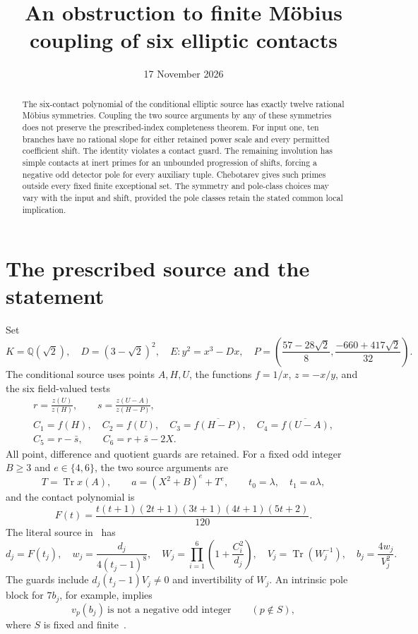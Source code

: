 \documentclass[11pt,a4paper]{article}
\title{An obstruction to finite M\"obius coupling of six elliptic contacts}
\author{}\date{17 November 2026}
\newcommand{\Q}{\mathbb Q}\newcommand{\Z}{\mathbb Z}
\DeclareMathOperator{\Tr}{Tr}\DeclareMathOperator{\Gal}{Gal}
\begin{document}
\maketitle
\begin{abstract}
The six-contact polynomial of the conditional elliptic source has
exactly twelve rational M\"obius symmetries. Coupling the two source
arguments by any of these symmetries does not preserve the prescribed-index
completeness theorem. For input one, ten branches have no rational slope
for either retained power scale and every permitted coefficient shift.
The identity violates a contact guard. The remaining involution has
simple contacts at inert primes for an unbounded progression of shifts,
forcing a negative odd detector pole for every auxiliary tuple.
Chebotarev gives such primes outside every fixed finite exceptional set.
The symmetry and pole-class choices may vary with the input and shift,
provided the pole classes retain the stated common local implication.
\end{abstract}

\section{The prescribed source and the statement}

Set
\[
 K=\Q(\sqrt2),\quad D=(3-\sqrt2)^2,\quad E:y^2=x^3-Dx,
 \quad P=\left(\frac{57-28\sqrt2}{8},
                    \frac{-660+417\sqrt2}{32}\right).
\]
The conditional source uses points $A,H,U$, the functions
$f=1/x$, $z=-x/y$, and the six field-valued tests
\begin{equation}\label{eq:tests}
\begin{gathered}
 r=\frac{z(U)}{z(H)},\qquad s=\frac{z(U-A)}{z(H-P)},\\
 C_1=f(H),\quad C_2=f(U),\quad
 C_3=\overline{f(H-P)},\quad C_4=\overline{f(U-A)},\\
 C_5=r-\bar s,\qquad C_6=r+\bar s-2X.
\end{gathered}
\end{equation}
All point, difference and quotient guards are retained. For a fixed odd
integer $B\ge3$ and $e\in\{4,6\}$, the two source arguments are
\begin{equation}\label{eq:source}
 T=\Tr x(A),\qquad a=(X^2+B)^e+T^e,
 \qquad t_0=\lambda,\quad t_1=a\lambda,
\end{equation}
and the contact polynomial is
\begin{equation}\label{eq:F}
 F(t)=\frac{t(t+1)(2t+1)(3t+1)(4t+1)(5t+2)}{120}.
\end{equation}
The literal source in~\cite{Reweighted} has
\begin{equation}\label{eq:detector}
 d_j=F(t_j),\quad w_j=\frac{d_j}{4(t_j-1)^8},\quad
 W_j=\prod_{i=1}^6\left(1+\frac{C_i^2}{d_j}\right),\quad
 V_j=\Tr(W_j^{-1}),\quad b_j=\frac{4w_j}{V_j^2}.
\end{equation}
The guards include $d_j(t_j-1)V_j\ne0$ and invertibility of $W_j$.
An intrinsic pole block for $7b_j$, for example, implies
\begin{equation}\label{eq:localpole}
 v_p(b_j)\ \text{is not a negative odd integer}\qquad(p\notin S),
\end{equation}
where $S$ is fixed and finite~\cite{Intrinsic}.
\end{document}
